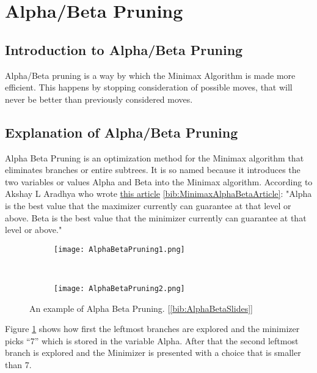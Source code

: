 \section{Alpha/Beta Pruning} 
\label{sec:Alpha/Beta Pruning}

\subsection{Introduction to Alpha/Beta Pruning}
\label{subsec:Introduction to Alpha/Beta Pruning}
Alpha/Beta pruning is a way by which the Minimax Algorithm is made more efficient.
This happens by stopping consideration of possible moves, that will never be better than previously considered moves.

\subsection{Explanation of Alpha/Beta Pruning}
\label{subsec:Explanation of Alpha/Beta Pruning}
Alpha Beta Pruning is an optimization method for the Minimax algorithm that eliminates branches or entire subtrees. 
It is so named because it introduces the two variables or values Alpha and Beta into the Minimax algorithm.
According to Akshay L Aradhya who wrote \href{https://www.geeksforgeeks.org/minimax-algorithm-in-game-theory-set-4-alpha-beta-pruning/}{this article} \ref{bib:MinimaxAlphaBetaArticle}:
"Alpha is the best value that the maximizer currently can guarantee at that level or above. 
Beta is the best value that the minimizer currently can guarantee at that level or above."
\begin{figure}
    \centering %
    \begin{subfigure}[b]{0.3\textwidth}
        \texttt{[image: AlphaBetaPruning1.png]}           
    \end{subfigure}
    ~
    \begin{subfigure}[b]{0.3\textwidth}
        \texttt{[image: AlphaBetaPruning2.png]}       
    \end{subfigure}
    \caption{An example of Alpha Beta Pruning. [\ref{bib:AlphaBetaSlides}]} %
    \label{fig:AlphaBetaPruningA}
  \end{figure}
Figure \ref{fig:AlphaBetaPruningA}  shows how first the leftmost branches are explored 
and the minimizer picks “7” which is stored in the variable Alpha. 
After that the second leftmost branch is explored and the Minimizer is presented with a choice that is smaller than 7.
